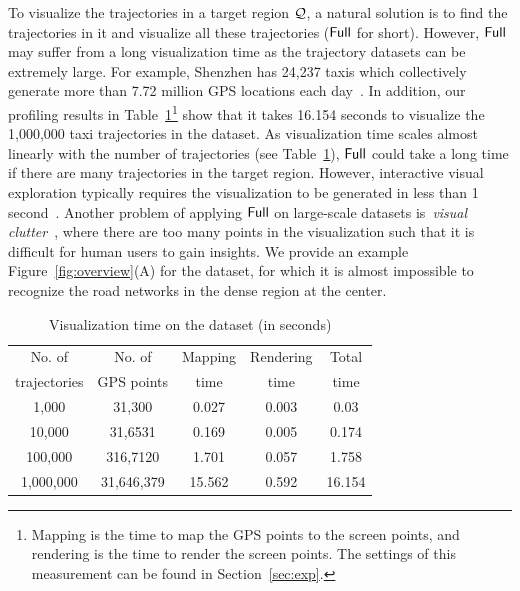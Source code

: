  To visualize the trajectories in a target region $\mathcal{Q}$, a natural solution is to find the trajectories in it and visualize all these trajectories ($\mathsf{Full}$ for short). However, $\mathsf{Full}$ may suffer from a long visualization time as the trajectory datasets can be extremely large. For example, Shenzhen has 24,237 taxis which collectively generate more than 7.72 million GPS locations each day~\cite{sz}. In addition, our profiling results in Table~\ref{tab:gpu}\footnote{Mapping is the time to map the GPS points to the screen points, and rendering is the time to render the screen points. The settings of this measurement can be found in Section~\ref{sec:exp}.} show that it takes 16.154 seconds to visualize the 1,000,000 taxi trajectories in the \pt{} dataset. As visualization time scales almost linearly with the number of trajectories (see Table~\ref{tab:gpu}), $\mathsf{Full}$ could take a long time if there are many trajectories in the target region. However, interactive visual exploration typically requires the visualization to be generated in less than 1 second~\cite{shneiderman1984response}. Another problem of applying $\mathsf{Full}$ on large-scale datasets is~\textit{visual clutter}~\cite{kwon2017sampling}, where there are too many points in the visualization such that it is difficult for human users to gain insights. We provide an example Figure~\ref{fig:overview}(A) for the \pt{} dataset, for which it is almost impossible to recognize the road networks in the dense region at the center.

\begin{table}
	\centering
	\small
	\caption{Visualization time on the \pt{} dataset (in seconds)}
    \trim
	\begin{tabular}{|c|c|c|c|c|} \hline
		No. of  & No. of & Mapping & Rendering & Total \\
         trajectories &  GPS points & time & time & time \\ \hline
		1,000& 31,300 & 0.027 & 0.003 & 0.03 \\ \hline
		10,000& 31,6531 & 0.169 & 0.005 & 0.174\\ \hline
		100,000& 316,7120 & 1.701 & 0.057 & 1.758 \\ \hline
		1,000,000& 31,646,379 & 15.562 & 0.592 & 16.154 \\ \hline
	\end{tabular}	\label{tab:gpu}
    \trim \trim 
\end{table}



